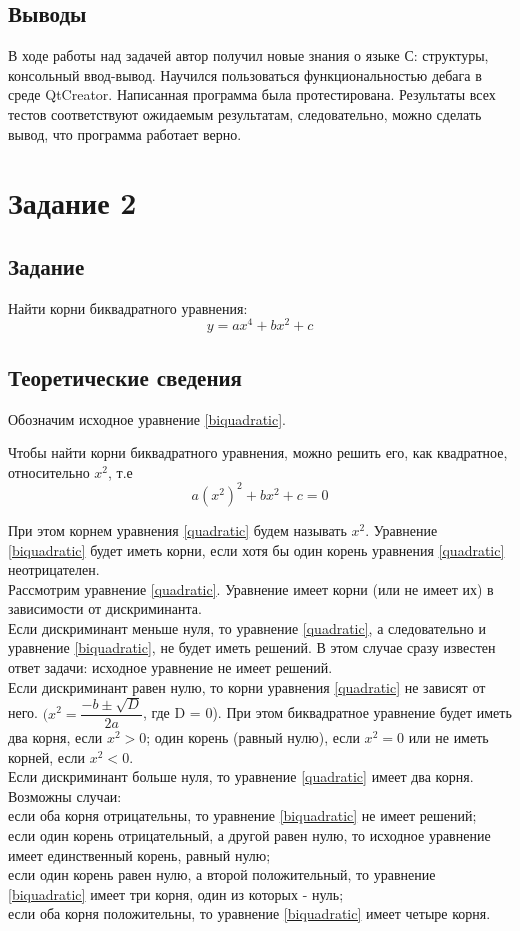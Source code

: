 \documentclass[12pt,a4paper]{report}
\begin{document}
\subsection{Выводы}
В ходе работы над задачей автор получил новые знания о языке С: структуры, консольный ввод-вывод. Научился пользоваться функциональностью дебага в среде QtCreator. Написанная программа была протестирована. Результаты всех тестов соответствуют ожидаемым результатам, следовательно, можно сделать вывод, что программа работает верно. 

\section{Задание 2}
\subsection{Задание}
Найти корни биквадратного уравнения: 
\begin{equation}
\label{biquadratic}
y = ax^{4} + bx^{2} + c
\end{equation}
\subsection{Теоретические сведения}
Обозначим исходное уравнение \ref{biquadratic}.

Чтобы найти корни биквадратного уравнения, можно решить его, как квадратное, относительно $x^{2}$, т.е
\begin{equation}
\label{quadratic}
  a(x^{2})^{2} + bx^{2} + c = 0
\end{equation}

При этом корнем уравнения \ref{quadratic} будем называть $x^{2}$.
Уравнение \ref{biquadratic} будет иметь корни, если хотя бы один корень уравнения \ref{quadratic} неотрицателен. \\
Рассмотрим уравнение \ref{quadratic}. Уравнение имеет корни (или не имеет их) в зависимости от дискриминанта. \\
Если дискриминант меньше нуля, то уравнение \ref{quadratic}, а следовательно и уравнение \ref{biquadratic}, не будет иметь решений. В этом случае сразу известен ответ задачи: исходное уравнение не имеет решений. \\
Если дискриминант равен нулю, то корни уравнения \ref{quadratic} не зависят от него. $(x^{2} = \dfrac{-b \pm \sqrt{D}}{2a}$, где D = 0). При этом биквадратное уравнение будет иметь два корня, если $x^{2} > 0$; один корень (равный нулю), если $x^{2} = 0$ или не иметь корней, если $x^{2} < 0$. \\ 
Если дискриминант больше нуля, то уравнение \ref{quadratic} имеет два корня. Возможны случаи: \\
если оба корня отрицательны, то уравнение \ref{biquadratic} не имеет решений; \\
если один корень отрицательный, а другой равен нулю, то исходное уравнение имеет единственный корень, равный нулю; \\
если один корень равен нулю, а второй положительный, то уравнение \ref{biquadratic} имеет три корня, один из которых - нуль; \\
если оба корня положительны, то уравнение \ref{biquadratic} имеет четыре корня. 
\end{document}
